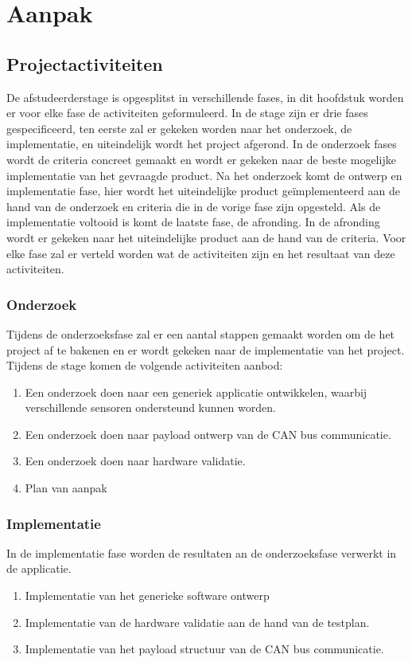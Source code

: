 \chapter{Aanpak} \label{ch:aanpak}

\section{Projectactiviteiten}
De afstudeerderstage is opgesplitst in verschillende fases, in dit hoofdstuk worden er voor elke fase de activiteiten geformuleerd. In de stage zijn er drie fases gespecificeerd, ten eerste zal er gekeken worden naar het onderzoek, de implementatie, en uiteindelijk wordt het project afgerond. In de onderzoek fases wordt de criteria concreet gemaakt en wordt er gekeken naar de beste mogelijke implementatie van het gevraagde product. Na het onderzoek komt de ontwerp en implementatie fase, hier wordt het uiteindelijke product geïmplementeerd aan de hand van de onderzoek en criteria die in de vorige fase zijn opgesteld. Als de implementatie voltooid is komt de laatste fase, de afronding. In de afronding wordt er gekeken naar het uiteindelijke product aan de hand van de criteria. Voor elke fase zal er verteld worden wat de activiteiten zijn en het resultaat van deze activiteiten.

\subsection{Onderzoek}
Tijdens de onderzoeksfase zal er een aantal stappen gemaakt worden om de het project af te bakenen en er wordt gekeken naar de implementatie van het project. Tijdens de stage komen de volgende activiteiten aanbod:
\begin{enumerate}
	\item Een onderzoek doen naar een generiek applicatie ontwikkelen, waarbij verschillende sensoren ondersteund kunnen worden.
	\item Een onderzoek doen naar payload ontwerp van de CAN bus communicatie.
	\item Een onderzoek doen naar hardware validatie.
	\item Plan van aanpak
\end{enumerate}

\subsection{Implementatie}
In de implementatie fase worden de resultaten an de onderzoeksfase verwerkt in de applicatie. 
\begin{enumerate}
	\item Implementatie van het generieke software ontwerp
	\item Implementatie van de hardware validatie aan de hand van de testplan.
	\item Implementatie van het payload structuur van de CAN bus communicatie.
\end{enumerate}

